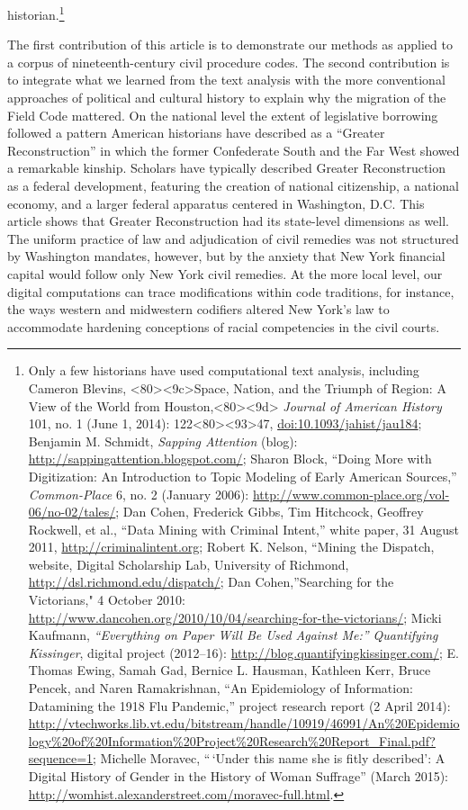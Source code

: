 \documentclass[12pt,]{article}
\let\rmarkdownfootnote\footnote%
\def\footnote{\protect\rmarkdownfootnote}
\begin{document}
historian.\footnote{Only a few historians have used computational text
  analysis, including Cameron Blevins,
  \textless80\textgreater\textless9c\textgreater Space, Nation, and the
  Triumph of Region: A View of the World from
  Houston,\textless80\textgreater\textless9d\textgreater{} \emph{Journal
  of American History} 101, no. 1 (June 1, 2014):
  122\textless80\textgreater\textless93\textgreater47,
  \url{doi:10.1093/jahist/jau184}; Benjamin M. Schmidt, \emph{Sapping
  Attention} (blog): \url{http://sappingattention.blogspot.com/}; Sharon
  Block, ``Doing More with Digitization: An Introduction to Topic
  Modeling of Early American Sources,'' \emph{Common-Place} 6, no. 2
  (January 2006): \url{http://www.common-place.org/vol-06/no-02/tales/};
  Dan Cohen, Frederick Gibbs, Tim Hitchcock, Geoffrey Rockwell, et al.,
  ``Data Mining with Criminal Intent,'' white paper, 31 August 2011,
  \url{http://criminalintent.org}; Robert K. Nelson, ``Mining the
  Dispatch, website, Digital Scholarship Lab, University of Richmond,
  \url{http://dsl.richmond.edu/dispatch/}; Dan Cohen,''Searching for the
  Victorians," 4 October 2010:
  \url{http://www.dancohen.org/2010/10/04/searching-for-the-victorians/};
  Micki Kaufmann, \emph{``Everything on Paper Will Be Used Against Me:''
  Quantifying Kissinger}, digital project (2012--16):
  \url{http://blog.quantifyingkissinger.com/}; E. Thomas Ewing, Samah
  Gad, Bernice L. Hausman, Kathleen Kerr, Bruce Pencek, and Naren
  Ramakrishnan, ``An Epidemiology of Information: Datamining the 1918
  Flu Pandemic,'' project research report (2 April 2014):
  \url{http://vtechworks.lib.vt.edu/bitstream/handle/10919/46991/An\%20Epidemiology\%20of\%20Information\%20Project\%20Research\%20Report_Final.pdf?sequence=1};
  Michelle Moravec, ``\,`Under this name she is fitly described': A
  Digital History of Gender in the History of Woman Suffrage'' (March
  2015): \url{http://womhist.alexanderstreet.com/moravec-full.html}.}

The first contribution of this article is to demonstrate our methods as
applied to a corpus of nineteenth-century civil procedure codes. The
second contribution is to integrate what we learned from the text
analysis with the more conventional approaches of political and cultural
history to explain why the migration of the Field Code mattered. On the
national level the extent of legislative borrowing followed a pattern
American historians have described as a ``Greater Reconstruction'' in
which the former Confederate South and the Far West showed a remarkable
kinship. Scholars have typically described Greater Reconstruction as a
federal development, featuring the creation of national citizenship, a
national economy, and a larger federal apparatus centered in Washington,
D.C. This article shows that Greater Reconstruction had its state-level
dimensions as well. The uniform practice of law and adjudication of
civil remedies was not structured by Washington mandates, however, but
by the anxiety that New York financial capital would follow only New
York civil remedies. At the more local level, our digital computations
can trace modifications within code traditions, for instance, the ways
western and midwestern codifiers altered New York's law to accommodate
hardening conceptions of racial competencies in the civil courts.
\end{document}
